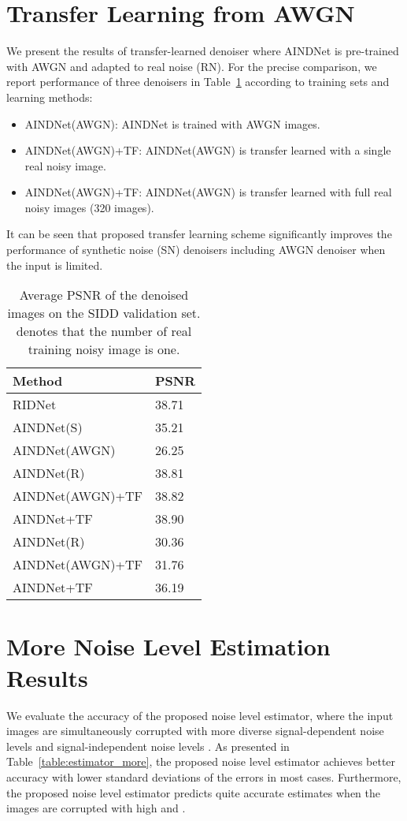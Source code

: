\documentclass[10pt,twocolumn,letterpaper]{article}
\begin{document}
\section{Transfer Learning from AWGN}
We present the results of transfer-learned denoiser where AINDNet is pre-trained with AWGN and adapted to real noise (RN).
For the precise comparison, we report performance of three denoisers in Table~\ref{talbe:AWGN} according to training sets and learning methods:
\begin{itemize}
	\item AINDNet(AWGN): AINDNet is trained with AWGN images.	
	\item AINDNet(AWGN)+TF: AINDNet(AWGN) is transfer learned with a single real noisy image.		
	\item AINDNet(AWGN)+TF: AINDNet(AWGN) is transfer learned with full real noisy images (320 images).	
\end{itemize}
It can be seen that proposed transfer learning scheme significantly improves the performance of synthetic noise (SN) denoisers including AWGN denoiser when the input is limited. 

\begin{table}[h]
	\centering
	\caption{Average PSNR of the denoised images on the SIDD validation set.  denotes that the number of real training noisy image is one.}
	\label{talbe:AWGN}
	\begin{adjustbox}{width=0.6\linewidth}
		\begin{tabular}{ll}
			\toprule			
			Method &   PSNR   \\
			\midrule
			RIDNet~\cite{Anwar_2019_ICCV} & 38.71 \\
			\midrule
			AINDNet(S) & 35.21  \\
			AINDNet(AWGN) & 26.25 \\
			AINDNet(R) & 38.81 \\
			AINDNet(AWGN)+TF &  38.82  \\
			AINDNet+TF & 38.90\\			
			\midrule
			AINDNet(R) & 30.36 \\
			AINDNet(AWGN)+TF & 31.76 \\
			AINDNet+TF & 36.19 \\			
			\bottomrule						
		\end{tabular}
	\end{adjustbox}
\end{table}

\section{More Noise Level Estimation Results}
We evaluate the accuracy of the proposed noise level estimator, where the input images are simultaneously corrupted with more diverse signal-dependent noise levels  and signal-independent noise levels . As presented in Table~\ref{table:estimator_more}, the proposed noise level estimator achieves better accuracy with lower standard deviations of the errors in most cases.
Furthermore, the proposed noise level estimator predicts quite accurate estimates when the images are corrupted with high  and .
\end{document}
